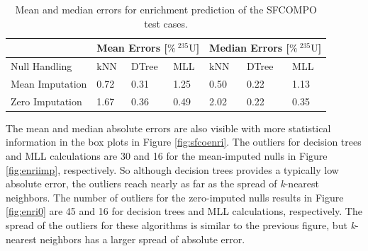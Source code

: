 \begin{table}[!htb]
  \centering
  \begin{tabular}{@{}m{1.5in}llllll@{}}
    \toprule
                     & \multicolumn{3}{m{2in}}{Mean Errors [$\%\:{}^{235}\text{U}$]} 
                     & \multicolumn{3}{l}{Median Errors [$\%\:{}^{235}\text{U}$]} 
                     \\ \toprule
    Null Handling    & kNN  & DTree & MLL  & kNN   & DTree & MLL    \\ \midrule
    Mean Imputation  & 0.72 & 0.31  & 1.25 & 0.50  & 0.22  & 1.13   \\
    Zero Imputation  & 1.67 & 0.36  & 0.49 & 2.02  & 0.22  & 0.35   \\ \bottomrule
  \end{tabular}
  \caption[Performance of enrichment regression of \acrshort{SFCOMPO} entries]
          {Mean and median errors for enrichment prediction of the \gls{SFCOMPO} 
           test cases.}
  \label{tbl:sfcoenri}
\end{table}

The mean and median absolute errors are also visible with more statistical
information in the box plots in Figure \ref{fig:sfcoenri}. The outliers for
decision trees and \gls{MLL} calculations are 30 and 16 for the mean-imputed nulls
in Figure \ref{fig:enriimp}, respectively. So although decision trees provides
a typically low absolute error, the outliers reach nearly as far as the spread
of \textit{k}-nearest neighbors. The number of outliers for the zero-imputed nulls
results in Figure \ref{fig:enri0} are 45 and 16 for decision trees and
\gls{MLL} calculations, respectively.  The spread of the outliers for these
algorithms is similar to the previous figure, but \textit{k}-nearest neighbors
has a larger spread of absolute error.

